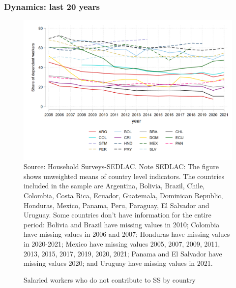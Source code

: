 \documentclass{beamer}
\begin{document}
\begin{frame}
\frametitle{Dynamics: last 20 years}
\begin{figure}[!htb]
        \justifying
        \caption{Salaried workers who do not contribute to SS by country}     
        \includegraphics[scale=.2]{latex/figures/Evolution/informal_ss_dep_all.png}
        \label{fig:Evolution_informalssdep}
        \footnotesize{Source: Household Surveys-SEDLAC.}
       \footnotesize{Note SEDLAC: The figure shows unweighted means of country level indicators. The countries included in the sample are Argentina, Bolivia, Brazil, Chile, Colombia, Costa Rica, Ecuador, Guatemala, Dominican Republic, Honduras, Mexico, Panama, Peru, Paraguay, El Salvador and Uruguay. Some countries don’t have information for the entire period: Bolivia and Brazil have missing values in 2010; Colombia have missing values in 2006 and 2007; Honduras have missing values in 2020-2021; Mexico have missing values 2005, 2007, 2009, 2011, 2013, 2015, 2017, 2019, 2020, 2021; Panama and El Salvador have missing values 2020; and Uruguay have missing values in 2021.}
 \end{figure}
 \end{frame}
\end{document}
